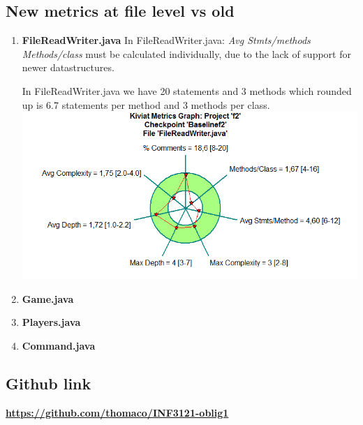 \documentclass{article}
\begin{document}
\subsection{New metrics at file level vs old} %
\begin{enumerate}
	\item
	\textbf{FileReadWriter.java}
	In FileReadWriter.java:\newline
	\textit{Avg Stmts/methods Methods/class} must be calculated individually, due to the lack
	of support for newer datastructures.

	In FileReadWriter.java we have 20 statements and 3 methods which 
	rounded up is 6.7 statements per method and 3 methods per class.\newline
	\includegraphics[scale=0.5]{Kiviat-filereadwriter-after.png}\newline

	\item
	\textbf{Game.java}

	\item
	\textbf{Players.java} %


	\item%
	\textbf{Command.java}

\end{enumerate}


\subsection{Github link}
\href{https://github.com/thomaco/INF3121-oblig1}{\textbf{https://github.com/thomaco/INF3121-oblig1}}
\end{document}
